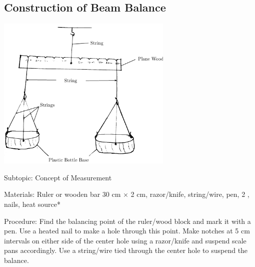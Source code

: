 \subsection{Construction of Beam Balance}
\label{sub:beambalance}

\begin{center}
\includegraphics{./img/beam-balance.png}
\end{center}

\begin{description*}
\item[Subtopic:]{Concept of Measurement}
\item[Materials:]{Ruler or wooden bar 30 cm $\times$ 2 cm, razor/knife, string/wire, pen, 2 , nails, heat source*}
\item[Procedure:]{Find the balancing point of the ruler/wood block and mark it with a pen. Use a heated nail to make a hole through this point. Make notches at 5 cm intervals on either side of the center hole using a razor/knife and suspend scale pans accordingly. Use a string/wire tied through the center hole to suspend the balance.}
\end{description*}

